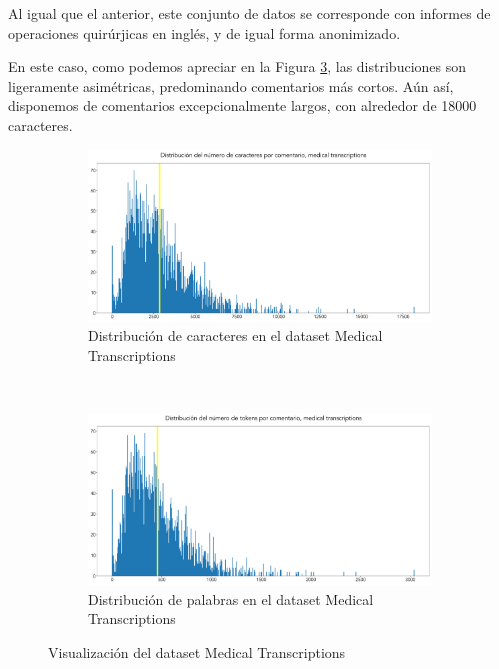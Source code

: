 Al igual que el anterior, este conjunto de datos se corresponde con informes de operaciones quirúrjicas en inglés, y de igual forma anonimizado.

En este caso, como podemos apreciar en la Figura \ref{fig:sum_mdtr}, las distribuciones son ligeramente asimétricas, predominando comentarios más cortos. Aún así, disponemos de comentarios excepcionalmente largos, con alrededor de 18000 caracteres.

\begin{figure}[h!]
	\centering
	\begin{subfigure}[t]{0.95\textwidth}
		\centering
		\includegraphics[width=.9\textwidth]{media/char_hist_mdtr.pdf}
		\caption{Distribución de caracteres en el dataset Medical Transcriptions}
		\label{fig:char_hist_mdtr}
	\end{subfigure}

	~
	\begin{subfigure}[t]{0.95\textwidth}
		\centering
		\includegraphics[width=.9\textwidth]{media/token_hist_mdtr.pdf}
		\caption{Distribución de palabras en el dataset Medical Transcriptions}
		\label{fig:token_hist_mdtr}
	\end{subfigure}

	\caption{Visualización del dataset Medical Transcriptions}
	\label{fig:sum_mdtr}
\end{figure}



